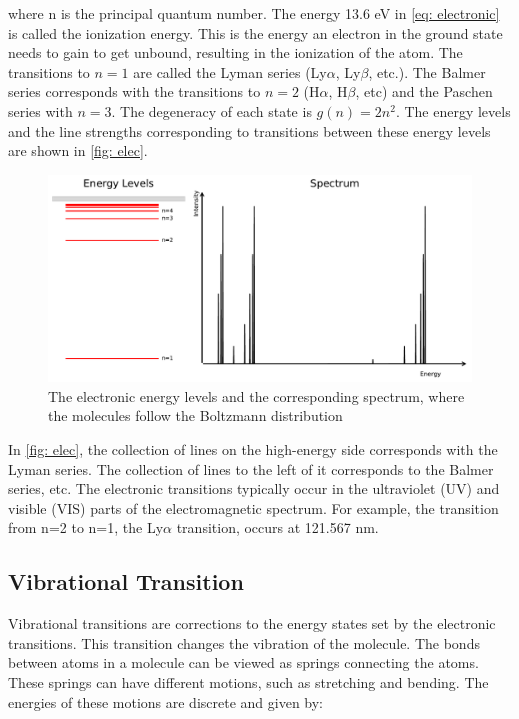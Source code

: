 \documentclass[twoside, single, authoryear, semicolon, 12pt]{lion-msc}
\newcommand{\4}{$_4$}
\newcommand{\3}{$_3$}
\newcommand{\2}{$_2$}
\begin{document}
where n is the principal quantum number. The energy 13.6 eV in \autoref{eq: electronic} is called the ionization energy. This is the energy an electron in the ground state needs to gain to get unbound, resulting in the ionization of the atom. The transitions to $n=1$ are called the Lyman series (Ly$\alpha$, Ly$\beta$, etc.). The Balmer series corresponds with the transitions to $n=2$ (H$\alpha$, H$\beta$, etc) and the Paschen series with $n=3$. The degeneracy of each state is $g(n)=2n^2$. The energy levels and the line strengths corresponding to transitions between these energy levels are shown in \autoref{fig: elec}.

\begin{figure}[H]
    \centering
    \includegraphics[width=\linewidth]{Figures/ElecSpectrum.pdf}
    \caption{The electronic energy levels and the corresponding spectrum, where the molecules follow the Boltzmann distribution}
    \label{fig: elec}
\end{figure}

In \autoref{fig: elec}, the collection of lines on the high-energy side corresponds with the Lyman series. The collection of lines to the left of it corresponds to the Balmer series, etc.
The electronic transitions typically occur in the ultraviolet (UV) and visible (VIS) parts of the electromagnetic spectrum. For example, the transition from n=2 to n=1, the Ly$\alpha$ transition, occurs at 121.567 nm.


\subsection{Vibrational Transition}
Vibrational transitions are corrections to the energy states set by the electronic transitions. This transition changes the vibration of the molecule. 
The bonds between atoms in a molecule can be viewed as springs connecting the atoms. These springs can have different motions, such as stretching and bending. The energies of these motions are discrete and given by: 
\end{document}
